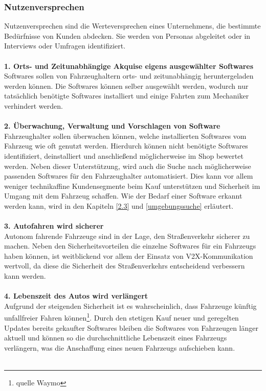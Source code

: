\subsubsection{Nutzenversprechen} \label{nv}
Nutzenversprechen sind die Werteversprechen eines Unternehmens, die bestimmte Bedürfnisse von Kunden abdecken. Sie werden von Personas abgeleitet oder in Interviews oder Umfragen identifiziert.\\\\
\textbf{1. Orts- und Zeitunabhängige Akquise eigens ausgewählter Softwares}\\
Softwares sollen von Fahrzeughaltern orts- und zeitunabhängig heruntergeladen werden können. Die Softwares können selber ausgewählt werden, wodurch nur tatsächlich benötigte Softwares installiert und einige Fahrten zum Mechaniker verhindert werden.\\\\
\textbf{2. Überwachung, Verwaltung und Vorschlagen von Software}\\
Fahrzeughalter sollen überwachen können, welche installierten Softwares vom Fahrzeug wie oft genutzt werden. Hierdurch können nicht benötigte Softwares identifiziert, deinstalliert und anschließend möglicherweise im Shop bewertet werden. Neben dieser Unterstützung, wird auch die Suche nach möglicherweise passenden Softwares für den Fahrzeughalter automatisiert. Dies kann vor allem weniger technikaffine Kundensegmente beim Kauf unterstützen und Sicherheit im Umgang mit dem Fahrzeug schaffen. Wie der Bedarf einer Software erkannt werden kann, wird in den Kapiteln \ref{2.3} und \ref{umgebungssuche} erläutert.\\\\
\textbf{3. Autofahren wird sicherer}\\
Autonom fahrende Fahrzeuge sind in der Lage, den Straßenverkehr sicherer zu machen.\cite[Vgl. ]{b103} Neben den Sicherheitsvorteilen die einzelne Softwares für ein Fahrzeugs haben können, ist weitblickend vor allem der Einsatz von V2X-Kommunikation wertvoll, da diese die Sicherheit des Straßenverkehrs entscheidend verbessern kann werden.\cite[Vgl. S. 19]{vda}\\\\
\textbf{4. Lebenszeit des Autos wird verlängert}\\
Aufgrund der steigenden Sicherheit ist es wahrscheinlich, dass Fahrzeuge künftig unfallfreier Fahren können\footnote{quelle Waymo}. Durch den stetigen Kauf neuer und geregelten Updates bereits gekaufter Softwares bleiben die Softwares von Fahrzeugen länger aktuell und können so die durchschnittliche Lebenszeit eines Fahrzeugs verlängern, was die Anschaffung eines neuen Fahrzeugs aufschieben kann.\\\\
